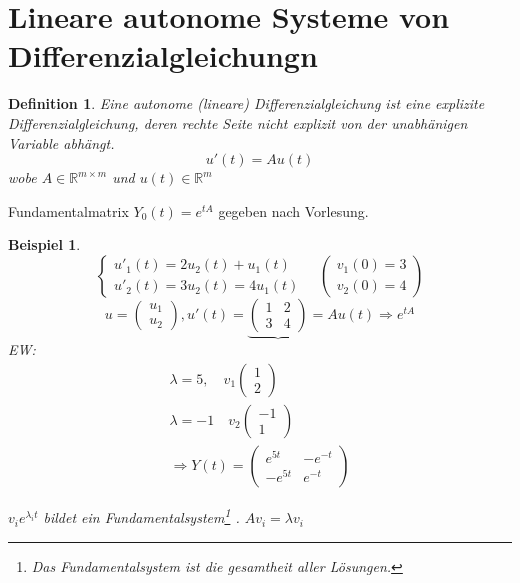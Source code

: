 \documentclass[11pt]{article}
\newcommand{\RR}{\mathbb{R}}
\newcounter{myCounter}[section]
\newtheorem{Def}[myCounter]{Definition}
\newtheorem{Bsp}[myCounter]{Beispiel}
\begin{document}
\section{Lineare autonome Systeme von Differenzialgleichungn}

\begin{Def}
  Eine autonome (lineare) Differenzialgleichung ist eine explizite Differenzialgleichung, deren rechte Seite nicht
  explizit von der unabh\"anigen Variable abh\"angt. \[
    u'(t) = A u(t) \]
  wobe  $A \in \RR^{m \times m}$ und $u(t) \in \RR^m$
\end{Def}

Fundamentalmatrix $Y_0(t) = e^{tA}$ gegeben nach Vorlesung.

\begin{Bsp}
  \[ \left\{ \begin{aligned} u'_1(t) = 2 u_2(t) + u_1(t) \\ u'_2(t) = 3 u_2(t) = 4
  u_1(t) \end{aligned} \right. \quad \begin{pmatrix} v_1(0) = 3 \\ v_2(0) = 4
\end{pmatrix} \] \[
  u = \begin{pmatrix} u_1 \\ u_2 \end{pmatrix}, u'(t) = \underbrace{\begin{pmatrix} 1 & 2 \\ 3
  & 4 \end{pmatrix}}{=A} u(t) \Rightarrow e^{tA}
  \]
  EW: \begin{align*}
     \lambda = 5, \quad v_1 \begin{pmatrix} 1 \\ 2 \end{pmatrix} \\ 
     \lambda =  -1 \quad v_2 \begin{pmatrix} -1 \\ 1 \end{pmatrix} \\
     \Rightarrow Y(t) = \begin{pmatrix} e^{5t} & -e^{-t} \\ -e^{5t} & e^{-t}
     \end{pmatrix}
   \end{align*}

   $v_i e^{\lambda_i t}$ bildet ein Fundamentalsystem\footnote{Das
   Fundamentalsystem ist die gesamtheit aller L\"osungen.}
     . $Av_i = \lambda v_i$


\end{Bsp}
\end{document}
